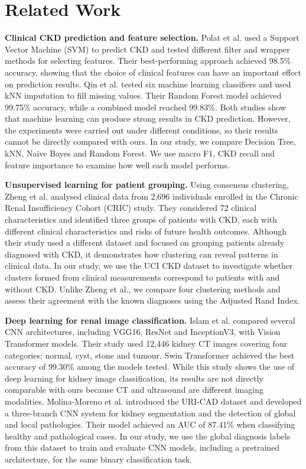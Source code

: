 \section{Related Work}

\noindent\textbf{Clinical CKD prediction and feature selection.}
Polat et al.\cite{polat2017} used a Support Vector Machine (SVM) to predict CKD and tested different filter and wrapper methods for selecting features. Their best-performing approach achieved 98.5\% accuracy, showing that the choice of clinical features can have an important effect on prediction results. Qin et al.\cite{qin2020} tested six machine learning classifiers and used kNN imputation to fill missing values. Their Random Forest model achieved 99.75\% accuracy, while a combined model reached 99.83\%. Both studies show that machine learning can produce strong results in CKD prediction. However, the experiments were carried out under different conditions, so their results cannot be directly compared with ours. In our study, we compare Decision Tree, kNN, Naive Bayes and Random Forest. We use macro F1, CKD recall and feature importance to examine how well each model performs.

\noindent\textbf{Unsupervised learning for patient grouping.}
Using consensus clustering, Zheng et al.\cite{zheng2021} analysed clinical data from 2,696 individuals enrolled in the Chronic Renal Insufficiency Cohort (CRIC) study. They considered 72 clinical characteristics and identified three groups of patients with CKD, each with different clinical characteristics and risks of future health outcomes. Although their study used a different dataset and focused on grouping patients already diagnosed with CKD, it demonstrates how clustering can reveal patterns in clinical data. In our study, we use the UCI CKD dataset to investigate whether clusters formed from clinical measurements correspond to patients with and without CKD. Unlike Zheng et al., we compare four clustering methods and assess their agreement with the known diagnoses using the Adjusted Rand Index.


\noindent\textbf{Deep learning for renal image classification.}
Islam et al.\cite{islam2022} compared several CNN architectures, including VGG16, ResNet and InceptionV3, with Vision Transformer models. Their study used 12,446 kidney CT images covering four categories: normal, cyst, stone and tumour. Swin Transformer achieved the best accuracy of 99.30\% among the models tested. While this study shows the use of deep learning for kidney image classification, its results are not directly comparable with ours because CT and ultrasound are different imaging modalities. Molina-Moreno et al.\cite{uricad2024} introduced the URI-CAD dataset and developed a three-branch CNN system for kidney segmentation and the detection of global and local pathologies. Their model achieved an AUC of 87.41\% when classifying healthy and pathological cases. In our study, we use the global diagnosis labels from this dataset to train and evaluate CNN models, including a pretrained architecture, for the same binary classification task.

